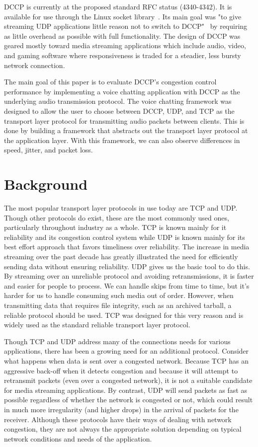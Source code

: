 \documentclass[letterpaper, 9 pt, balance, conference]{ieeeconf}
\begin{document}
DCCP is currently at the proposed standard RFC status (4340-4342). It is
available for use through the Linux socket library~\cite{dccp_website}. Its main
goal was "to give streaming UDP applications little reason not to switch to
DCCP"~\cite{dccp_wg} by requiring as little overhead as possible with full
functionality. The design of DCCP was geared mostly toward media streaming
applications which include audio, video, and gaming software where
responsiveness is traded for a steadier, less bursty network connection.

The main goal of this paper is to evaluate DCCP's congestion control performance
by implementing a voice chatting application with DCCP as the underlying audio
transmission protocol.  The voice chatting framework was designed to allow the
user to choose between DCCP, UDP, and TCP as the transport layer protocol for
transmitting audio packets between clients. This is done by building a framework
that abstracts out the transport layer protocol at the application layer. With
this framework, we can also observe differences in speed, jitter, and packet
loss.

\section{Background}
\label{sec:backg}

The most popular transport layer protocols in use today are TCP and UDP. Though
other protocols do exist, these are the most commonly used ones, particularly
throughout industry as a whole. TCP is known mainly for it reliability and its
congestion control system while UDP is known mainly for its best effort approach
that favors timeliness over reliability. The increase in media streaming over
the past decade has greatly illustrated the need for efficiently sending data
without ensuring reliability. UDP gives us the basic tool to do this. By
streaming over an unreliable protocol and avoiding retransmissions, it is faster and
easier for people to process. We can handle skips from time to time, but it's
harder for us to handle consuming such media out of order. However, when
transmitting data that requires file integrity, such as an archived tarball, a
reliable protocol should be used. TCP was designed for this very reason and is
widely used as the standard reliable transport layer protocol.

Though TCP and UDP address many of the connections needs for various
applications, there has been a growing need for an additional protocol. Consider
what happens when data is sent over a congested network. Because TCP has an
aggressive back-off when it detects congestion and because it will attempt to
retransmit packets (even over a congested network), it is not a suitable
candidate for media streaming applications. By contrast, UDP
will send packets as fast as possible regardless of whether the network is
congested or not, which could result in much more irregularity (and higher
drops) in the arrival of packets for the receiver. Although these protocols have
their ways of dealing with network congestion, they are not always the
appropriate solution depending on typical network conditions and needs of the application.
\end{document}
